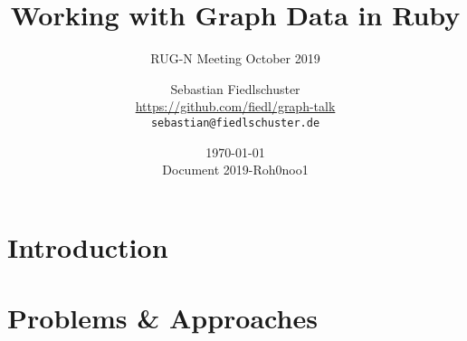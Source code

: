 \documentclass[green, 12pt]{beamer}
\title{Working with Graph Data in Ruby}
\subtitle{RUG-N Meeting October 2019}
\date{\today \\ \vspace*{2mm} \tiny{Document 2019-Roh0noo1} \normalsize}
\author[Sebastian Fiedlschuster]{Sebastian Fiedlschuster \\ \small{\url{https://github.com/fiedl/graph-talk}} \\ \small\texttt{sebastian@fiedlschuster.de}}
\begin{document}



\section{Introduction}


\section{Problems \& Approaches}






\end{document}
